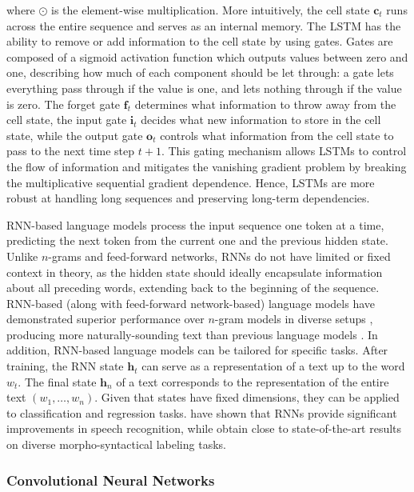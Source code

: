 \noindent where $\odot$ is the element-wise multiplication. More intuitively, the cell state $\bm{c}_t$ runs across the entire sequence and serves as an internal memory. The LSTM has the ability to remove or add information to the cell state by using gates. Gates are composed of a sigmoid activation function which outputs values between zero and one, describing how much of each component should be let through: a gate lets everything pass through if the value is one, and lets nothing through if the value is zero. The forget gate $\bm{f}_t$ determines what information to throw away from the cell state, the input gate $\bm{i}_t$ decides what new information to store in the cell state, while the output gate $\bm{o}_t$ controls what information from the cell state to pass to the next time step $t+1$. This gating mechanism allows \acp{LSTM} to control the flow of information and mitigates the vanishing gradient problem by breaking the multiplicative sequential gradient dependence. Hence, \acp{LSTM} are more robust at handling long sequences and preserving long-term dependencies.

\ac{RNN}-based language models process the input sequence one token at a time, predicting the next token from the current one and the previous hidden state. Unlike $n$-grams and feed-forward networks, \acp{RNN} do not have limited or fixed context in theory, as the hidden state should ideally encapsulate information about all preceding words, extending back to the beginning of the sequence.
\ac{RNN}-based (along with feed-forward network-based) language models have demonstrated superior performance over $n$-gram models in diverse setups \citep{mikolov2010recurrent}, producing more naturally-sounding text than previous language models \citep{kovavcevic2022bidirectional}. In addition, \ac{RNN}-based language models can be tailored for specific tasks. After training, the \ac{RNN} state $\bm{h}_t$ can serve as a representation of a text up to the word $w_t$. The final state $\bm{h}_{n}$ of a text corresponds to the representation of the entire text $(w_1, \ldots, w_n)$. Given that states have fixed dimensions, they can be applied to classification and regression tasks. \citet{schwenk2007continuous} have shown that \acp{RNN} provide significant improvements in speech recognition, while \citet{collobert2011deep} obtain close to state-of-the-art results on diverse morpho-syntactical labeling tasks.

\subsubsection{Convolutional Neural Networks}

